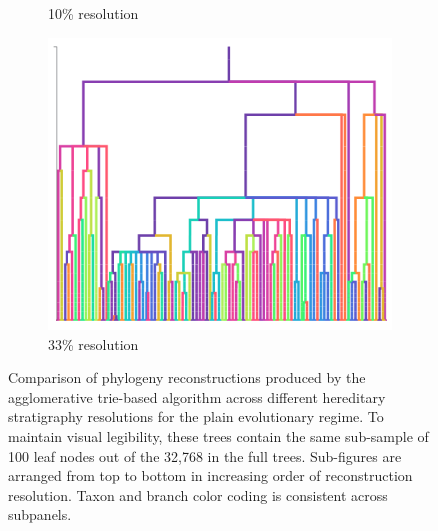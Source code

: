 \begin{figure}
\begin{subfigure}[b]{\linewidth}
    \caption{%
      10\% resolution}
    \label{fig:plain-perfect-and-reconstruction-phylogenies:resolution_10}
  \end{subfigure}
  \begin{subfigure}[b]{\linewidth}
    \centering
    \includegraphics[width=\textwidth, height=0.16\textheight]{img/plain_resolution_3} \caption{%
      33\% resolution}
    \label{fig:plain-perfect-and-reconstruction-phylogenies:resolution_3}
  \end{subfigure}
  \caption{%
    Comparison of phylogeny reconstructions produced by the agglomerative trie-based algorithm across different hereditary stratigraphy resolutions for the plain evolutionary regime.
    To maintain visual legibility, these trees contain the same sub-sample of 100 leaf nodes out of the 32,768 in the full trees.
    Sub-figures are arranged from top to bottom in increasing order of reconstruction resolution.
    Taxon and branch color coding is consistent across subpanels.
  }
  \label{fig:plain-perfect-and-reconstruction-phylogenies}
\end{figure}
